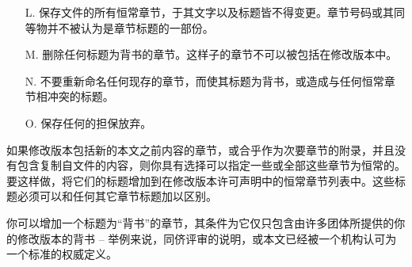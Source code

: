 \begin{itemize}
    \item[L.] 保存文件的所有恒常章节，于其文字以及标题皆不得变更。章节号码或其同等物并不被认为是章节标题的一部份。
    \item[M.] 删除任何标题为背书的章节。这样子的章节不可以被包括在修改版本中。
    \item[N.] 不要重新命名任何现存的章节，而使其标题为背书，或造成与任何恒常章节相冲突的标题。
    \item[O.] 保存任何的担保放弃。
\end{itemize}


如果修改版本包括新的本文之前内容的章节，或合乎作为次要章节的附录，并且没有包含复制自文件的内容，则你具有选择可以指定一些或全部这些章节为恒常的。要这样做，将它们的标题增加到在修改版本许可声明中的恒常章节列表中。这些标题必须可以和任何其它章节标题加以区别。


你可以增加一个标题为``背书''的章节，其条件为它仅只包含由许多团体所提供的你的修改版本的背书 -- 举例来说，同侪评审的说明，或本文已经被一个机构认可为一个标准的权威定义。


